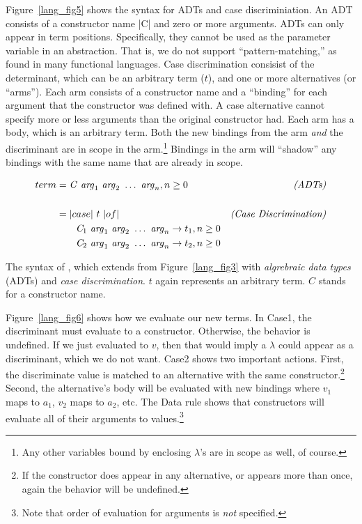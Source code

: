 \documentclass[12pt]{report}
\begin{document}
Figure~\ref{lang_fig5} shows the syntax for ADTs and case
discriminiation. An ADT consists of a constructor name |C| and zero or
more arguments. ADTs can only appear in term positions. Specifically,
they cannot be used as the parameter variable in an abstraction. That
is, we do not support ``pattern-matching,'' as found in many
functional languages. Case discrimination consisist of the
determinant, which can be an arbitrary term ($t$), and one or more
alternatives (or ``arms''). Each arm consists of a constructor name
and a ``binding'' for each argument that the constructor was defined
with. A case alternative cannot specify more or less arguments than
the original constructor had. Each arm has a body, which is an
arbitrary term. Both the new bindings from the arm \emph{and} the
discriminant are in scope in the arm.\footnote{Any other variables
  bound by enclosing $\lambda$'s are in scope as well, of course.}
Bindings in the arm will ``shadow'' any bindings with the same name
that are already in scope.

\begin{myfig}[tbh]
  \begin{minipage}{3in}
  \begin{align*}
    term &= \mathit{C}\ \mathit{arg}_1\ \mathit{arg}_2\ \ldots\ \mathit{arg}_n, n \ge 0 & \hfil\text{\emph{(ADTs)}} \\ \\
      &= |case|\ t\ |of| & \hfil\text{\emph{(Case Discrimination)}} \\
      & \qquad\mathit{C}_1\ \mathit{arg}_1\ \mathit{arg}_2\ \ldots\ \mathit{arg}_n \rightarrow t_1, n \ge 0 \\
      & \qquad\mathit{C}_2\ \mathit{arg}_1\ \mathit{arg}_2\ \ldots\ \mathit{arg}_n \rightarrow t_2, n \ge 0 
  \end{align*}
  \end{minipage}
  \caption{The syntax of \lamC, which extends \lamA from
    Figure~\ref{lang_fig3} with \emph{algrebraic data types} (ADTs)
    and \emph{case discrimination}. $t$ again represents an arbitrary
    term. $C$ stands for a constructor name.}
  \label{lang_fig5}
\end{myfig}

Figure~\ref{lang_fig6} shows how we evaluate our new terms. In {\sc
  Case1}, the discriminant must evaluate to a constructor. Otherwise,
the behavior is undefined. If we just evaluated to $v$, then that
would imply a $\lambda$ could appear as a discriminant, which we do
not want. {\sc Case2} shows two important actions. First, the
discriminate value is matched to an alternative with the same
constructor.\footnote{If the constructor does appear in any
  alternative, or appears more than once, again the behavior will be
  undefined. } Second, the alternative's body will be evaluated with
new bindings where $v_1$ maps to $a_1$, $v_2$ maps to $a_2$, etc. The
{\sc Data} rule shows that constructors will evaluate all of their
arguments to values.\footnote{Note that order of evaluation for
  arguments is \emph{not} specified.}
\end{document}
